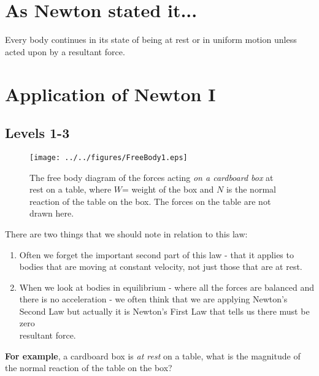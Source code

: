 




\addtolength{\topmargin}{-0.7 cm}
\setlength{\columnsep}{22pt}

\section{As Newton stated it...}

Every body continues in its state of being at rest or in uniform motion unless acted upon by a resultant force.
\setlength{\columnsep}{22pt}
\section{Application of Newton I}
\subsection*{Levels 1-3}
\begin{wrapfigure}{r}{6cm}
\vspace{-2.0cm}
\center
\texttt{[image: ../../figures/FreeBody1.eps]}
\caption{The free body diagram of the forces acting {\it on a cardboard box} at rest on a table, where $W$= weight of the box and $N$ is the normal reaction of the table on the box.  The forces on the table are not drawn here.}\vspace{-3.5cm}
\end{wrapfigure}

There are two things that we should note in relation to this law:
\begin{enumerate}
\item Often we forget the important second part of this law - that it applies to bodies that are moving at constant velocity, not just those that are at rest.   

\item When we look at bodies in equilibrium - where all the forces are balanced and there is no acceleration - we often think that we are applying Newton's Second Law but actually it is Newton's First Law that tells us there must be zero\\
resultant force.

\end{enumerate}
{\bf For example}, a cardboard box is {\it at rest} on a table, what is the magnitude of the normal reaction of the table on the box? \\

